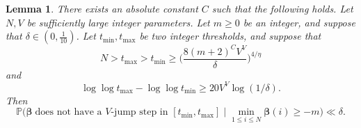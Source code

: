 \documentclass[11pt,reqno]{amsart}
\numberwithin{equation}{section}
\newtheorem{lemma}[theorem]{Lemma}
\theoremstyle{definition}
\theoremstyle{remark}
\newcommand{\mb}{\mathbb}
\def\boldbeta{\boldsymbol\beta}
\renewcommand{\le}{\leqslant}
\renewcommand{\ge}{\geqslant}
\begin{document}
\begin{lemma}\label{lemma7.19}
There exists an absolute constant $C$ such that the following holds. Let $N, V$ be sufficiently large integer parameters. Let $m \ge 0$ be an integer, and suppose that $\delta \in (0,\frac{1}{10})$. Let $t_{\min}, t_{\max}$ be two integer thresholds, and suppose that
\begin{equation}\label{tmin-threshold} N > t_{\max} > t_{\min} \ge \Big( \frac{8(m+2)^{C} V^V}{\delta} \Big)^{4/\eta}\end{equation} and
\begin{equation}\label{massive-scales} \log \log t_{\max} - \log \log t_{\min} \ge 20 V^{V} \log(1/\delta).\end{equation} Then 
\[ \mb{P}\big( \boldbeta \; \mbox{does not have a $V$-jump step in $[t_{\min}, t_{\max}]$} \mid \min_{1\le i \le N} \boldbeta(i) \ge -m\big) \ll \delta.\]
\end{lemma}
\end{document}
